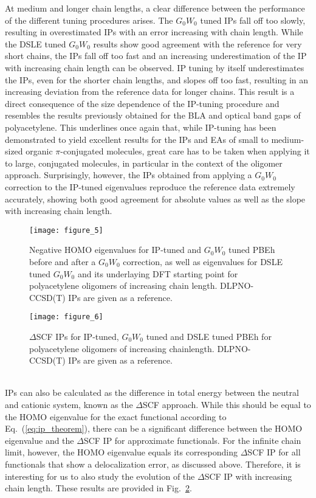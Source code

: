 \documentclass[journal=jctcce,manuscript=article,layout=twocolumn]{achemso}
\begin{document}
At medium and longer chain lengths, a clear difference between the performance of the different tuning procedures arises. The $G_0W_0$ tuned IPs fall off too slowly, resulting in overestimated IPs with an error increasing with chain length. While the DSLE tuned $G_0W_0$ results show good agreement with the reference for very short chains, the IPs fall off too fast and an increasing underestimation of the IP with increasing chain length can be observed.
IP tuning by itself underestimates the IPs, even for the shorter chain lengths, and slopes off too fast, resulting in an increasing deviation from the reference data for longer chains. This result is a direct consequence of the size dependence of the IP-tuning procedure and resembles the results previously obtained for the BLA\cite{jcp_2012_wPBE_PBEh_BLA_MESIE} and optical band gaps\cite{phys_rev_let_2016_tuning_lrc_polyene_baer_paper} of polyacetylene. 
This underlines once again that, while IP-tuning has been demonstrated to yield excellent results for the IPs and EAs of small to medium-sized organic $\pi$-conjugated molecules, great care has to be taken when applying it to large, conjugated molecules, in particular in the context of the oligomer approach. Surprisingly, however, the IPs obtained from applying a $G_0W_0$ correction to the IP-tuned eigenvalues reproduce the reference data extremely accurately, showing both good agreement for absolute values as well as the slope with increasing chain length.
\begin{figure}[tb]
\texttt{[image: figure\_5]}
\caption{Negative HOMO eigenvalues for IP-tuned and $G_0W_0$ tuned PBEh before and after a $G_0W_0$ correction, as well as eigenvalues for DSLE tuned $G_0W_0$ and its underlaying DFT starting point for polyacetylene oligomers of increasing chain length.
DLPNO-CCSD(T) IPs are given as a reference.\label{ip}}
\end{figure}
\begin{figure}[h!]
\texttt{[image: figure\_6]}
\caption{$\Delta$SCF IPs for IP-tuned, $G_0W_0$ tuned and DSLE tuned PBEh for polyacetylene oligomers of increasing chainlength. DLPNO-CCSD(T) IPs are given as a reference.\label{delta_scf}}
\end{figure}
\hfill \\
IPs can also be calculated as the difference in total energy between the neutral and cationic system, known as the $\Delta$SCF approach. 
While this should be equal to the HOMO eigenvalue for the exact functional according to Eq.~(\ref{eq:ip_theorem}), there can be a significant difference between the HOMO eigenvalue and the $\Delta$SCF IP for approximate functionals. For the infinite chain limit, however, the HOMO eigenvalue equals its corresponding $\Delta$SCF IP for all functionals that show a delocalization error, as discussed above. Therefore, it is interesting for us to also study the evolution of the $\Delta$SCF IP with increasing chain length. These results are provided in Fig.~\ref{delta_scf}.\cite{note2}  
\end{document}
